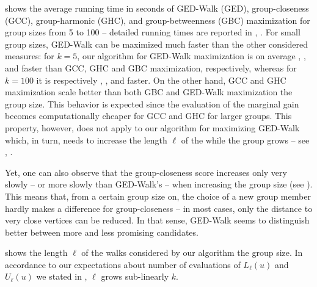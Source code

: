  shows the average running time in seconds
of GED-Walk (GED), group-closeness (GCC), group-harmonic (GHC), and
group-betweenness (GBC) maximization for group sizes from 5 to 100 -- detailed
running times are reported in ,
. For small group sizes, GED-Walk can be
maximized much faster than the other considered measures: for $k = 5$, our
algorithm for GED-Walk maximization is on average \gedSpeedupGCCkfive,
\gedSpeedupGHCkfive, and \gedSpeedupGBCkfive faster than GCC, GHC and GBC maximization,
respectively, whereas for $k = 100$ it is respectively
\gedSpeedupGCCkHundred, \gedSpeedupGHCkhundred, and
\gedSpeedupGBCkHundred faster.
%
On the other hand, GCC and GHC maximization scale better than both GBC and GED-Walk
maximization \wrt the group size. This behavior is expected since the
evaluation of the marginal gain becomes computationally cheaper for GCC and GHC
for larger groups. This property, however, does
not apply to our algorithm for maximizing GED-Walk which, in turn, needs to increase
the length $\ell$ of the while the group grows -- see ,
.

Yet, one can also observe that the group-closeness score increases only very slowly
-- or more slowly than GED-Walk's -- when increasing the group size (see
). This means that, from a certain group
size on, the choice of a new group member hardly makes a difference for
group-closeness -- in most cases, only the distance to very close vertices can
be reduced. In that sense, GED-Walk seems to distinguish better between more
and less promising candidates.

 shows the length $\ell$ of the walks
considered by our algorithm \wrt the group size. In accordance to our
expectations about number of evaluations of $L_{\ell}(u)$ and $U_{\ell}(u)$ we
stated in , $\ell$ grows sub-linearly
\wrt $k$.

